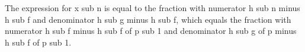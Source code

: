The expression for x sub n is equal to the fraction with numerator h sub n minus h sub f and denominator h sub g minus h sub f, which equals the fraction with numerator h sub f minus h sub f of p sub 1 and denominator h sub g of p minus h sub f of p sub 1.